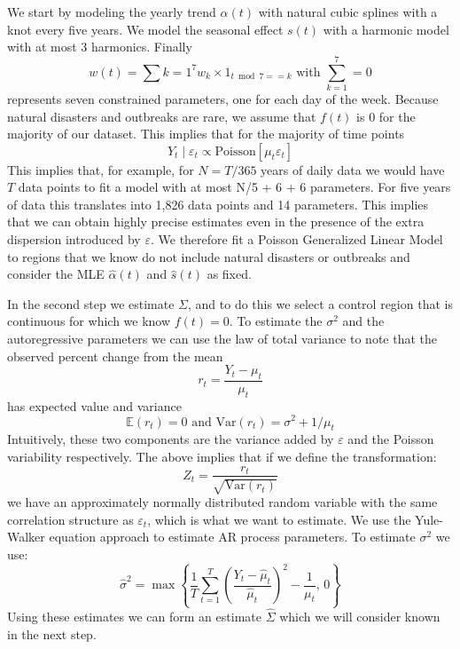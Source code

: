 \documentclass[11pt]{article}
\begin{document}
We start by modeling  the yearly trend $\alpha(t)$ with natural cubic splines with a knot every five years. We model the seasonal effect $s(t)$ with a harmonic model with at most 3 harmonics. Finally
\begin{equation*}
    w(t) = \sum{k=1}^7 w_k \times 1_{t \bmod 7  == k} \mbox{ with } \sum_{k=1}^7 = 0
\end{equation*}
represents seven constrained parameters, one for each day of the week. Because natural disasters and outbreaks are rare, we assume that $f(t)$ is 0 for the majority of our dataset. This implies that for the majority of time points
\begin{equation*}
    Y_t \mid \varepsilon_t \propto \mbox{Poisson}[ \mu_t  \varepsilon_t ]
\end{equation*}
This implies that, for example, for $N = T / 365$ years of daily data we would have $T$ data points to fit a model with at most N/5 + 6 + 6 parameters. For five years of data this translates into 1,826 data points and 14 parameters. This implies that we can obtain highly precise estimates even in the presence of the extra dispersion introduced by $\varepsilon$.  We therefore fit a Poisson Generalized Linear Model to regions that we know do not include natural disasters or outbreaks and consider the MLE $\hat{\alpha}(t)$ and $\hat{s}(t)$ as fixed.

In the second step we estimate $\Sigma$, and to do this we select a control region that is continuous for which we know $f(t)=0$. To estimate the $\sigma^2$ and the autoregressive parameters we can use the law of total variance to note that the observed percent change from the mean
\begin{equation*}
    r_t = \frac{Y_t - \mu_t}{\mu_t}
\end{equation*}
has expected value and variance
\begin{equation*}
    \mathbb{E}\left(r_t \right) = 0 \mbox{ and } \mbox{Var}\left(r_t\right)= \sigma^2 + 1/\mu_t
\end{equation*}
Intuitively, these two components are the variance added by $\varepsilon$ and the Poisson variability respectively. The above implies that if we define the transformation:
\begin{equation*}
    Z_t = \frac{r_t}{\sqrt{\mbox{Var}\left(r_t\right)}}
\end{equation*}
we have an approximately normally distributed random variable with the same correlation structure as $\varepsilon_t$, which is what we want to estimate. We use the Yule-Walker equation approach to estimate AR process parameters. To estimate $\sigma^2$ we use:
\begin{equation*}
    \hat{\sigma}^2 = \max\left\{ \frac{1}{T}\sum_{t=1}^T  \left(\frac{Y_t - \hat{\mu}_t}{\hat{\mu}_t}\right)^2  - \frac{1}{\mu_t}, \, 0\right\}
\end{equation*}
Using these estimates we can form an estimate $\hat{\Sigma}$ which we will consider known in the next step.
\end{document}
